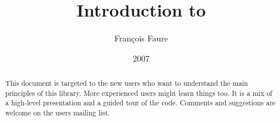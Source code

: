 \documentclass[a4paper,11pt]{article}
\title{Introduction to \sofa}
\author{Fran\c{c}ois Faure}
\date{2007}
\begin{document}
 
\maketitle

\begin{abstract}
This document is targeted to the new \sofa{} users who want to understand the main principles of this library. More experienced users might learn things too.
It is a mix of a high-level presentation and a guided tour of the code.
Comments and suggestions are welcome on the \sofa{} users mailing list.
\end{abstract}


\end{document}
